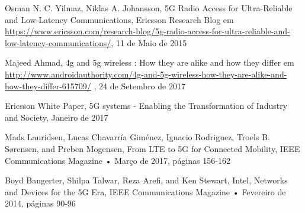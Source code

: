 \documentclass{llncs}
\begin{document}
\begin{thebibliography}{15}
     Osman N. C. Yilmaz, Niklas A. Johansson, 5G Radio Access for Ultra-Reliable and Low-Latency Communications, Ericsson Research Blog em \url{https://www.ericsson.com/research-blog/5g-radio-access-for-ultra-reliable-and-low-latency-communications/}, 11 de Maio de 2015

    Majeed Ahmad,
    4g and 5g wireless : How they are alike and how they differ em
    \url{http://www.androidauthority.com/4g-and-5g-wireless-how-they-are-alike-and-how-they-differ-615709/}
    , 24 de Setembro de 2017

     Ericsson White Paper, 5G systems - Enabling the Transformation of Industry and Society, Janeiro de 2017

     Mads Lauridsen, Lucas Chavarría Giménez, Ignacio Rodriguez, Troels B. Sørensen, and Preben Mogensen, From LTE to 5G for Connected Mobility, IEEE Communications Magazine • Março de 2017, páginas 156-162

     Boyd Bangerter, Shilpa Talwar, Reza Arefi, and Ken Stewart, Intel, Networks and Devices for the 5G Era, IEEE Communications Magazine • Fevereiro de 2014, páginas 90-96

\end{thebibliography}
\end{document}
